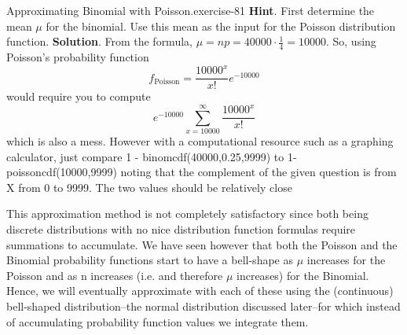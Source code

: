 \documentclass[10pt,]{book}
\numberwithin{equation}{section}
\begin{document}
%
\par
\hypertarget{p-1176}{}%
\begin{inlineexercise}{Approximating Binomial with Poisson.}{exercise-81}%
\textbf{Hint}.\quad%
\hypertarget{p-1177}{}%
First determine the mean \(\mu\) for the binomial. Use this mean as the input for the Poisson distribution function.%
\textbf{Solution}.\quad%
\hypertarget{p-1178}{}%
From the formula, \(\mu = np = 40000 \cdot \frac{1}{4} = 10000\). So, using Poisson's probability function%
\begin{equation*}
f_{\text{Poisson}} = \frac{10000^{x}}{x!}e^{-10000}
\end{equation*}
would require you to compute%
\begin{equation*}
e^{-10000} \sum_{x=10000}^{\infty} \frac{10000^{x}}{x!}
\end{equation*}
which is also a mess. However with a computational resource such as a graphing calculator, just compare 1 - binomcdf(40000,0.25,9999) to 1-poissoncdf(10000,9999) noting that the complement of the given question is from X from 0 to 9999. The two values should be relatively close%
\par
\hypertarget{p-1179}{}%
This approximation method is not completely satisfactory since both being discrete distributions with no nice distribution function formulas require summations to accumulate. We have seen however that both the Poisson and the Binomial probability functions start to have a bell-shape as \(\mu\) increases for the Poisson and as n increases (i.e. and therefore \(\mu\) increases) for the Binomial. Hence, we will eventually approximate with each of these using the (continuous) bell-shaped distribution--the normal distribution discussed later--for which instead of accumulating probability function values we integrate them.%
\end{inlineexercise}
%
\par
\hypertarget{p-1180}{}%
\end{document}
